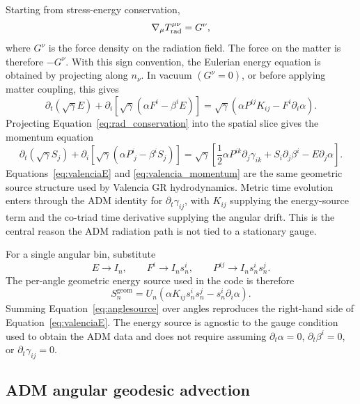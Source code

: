 \documentclass[11pt]{article}
\begin{document}
Starting from stress-energy conservation,
\begin{equation}
  \nabla_\mu T_{\rm rad}^{\mu\nu}=G^\nu ,
  \label{eq:rad_conservation}
\end{equation}
where \(G^\nu\) is the force density on the radiation field.  The force on the
matter is therefore \(-G^\nu\).  With this sign convention, the Eulerian energy
equation is obtained by projecting along \(n_\nu\).  In vacuum
\((G^\nu=0)\), or before applying matter coupling, this gives
\begin{equation}
  \partial_t(\sqrt{\gamma}E)
  +\partial_i\left[\sqrt{\gamma}(\alpha F^i-\beta^iE)\right]
  =
  \sqrt{\gamma}\left(\alpha P^{ij}K_{ij}
  -F^i\partial_i\alpha\right).
  \label{eq:valenciaE}
\end{equation}
Projecting Equation~\eqref{eq:rad_conservation} into the spatial slice gives
the momentum equation
\begin{equation}
  \partial_t(\sqrt{\gamma}S_j)
  +\partial_i\left[\sqrt{\gamma}(\alpha P^i_{\ j}-\beta^iS_j)\right]
  =
  \sqrt{\gamma}\left[
    \frac{1}{2}\alpha P^{ik}\partial_j\gamma_{ik}
    +S_i\partial_j\beta^i
    -E\partial_j\alpha\right].
  \label{eq:valencia_momentum}
\end{equation}
Equations~\eqref{eq:valenciaE} and \eqref{eq:valencia_momentum} are the same
geometric source structure used by Valencia GR hydrodynamics.  Metric time
evolution enters through the ADM identity for \(\partial_t\gamma_{ij}\), with
\(K_{ij}\) supplying the energy-source term and the co-triad time derivative
supplying the angular drift.  This is the central reason the ADM radiation path
is not tied to a stationary gauge.

For a single angular bin, substitute
\[
  E\rightarrow I_n,\qquad
  F^i\rightarrow I_ns^i_n,\qquad
  P^{ij}\rightarrow I_ns^i_ns^j_n .
\]
The per-angle geometric energy source used in the code is therefore
\begin{equation}
  S^{\mathrm{geom}}_n =
  U_n\left(\alpha K_{ij}s^i_ns^j_n
  -s^i_n\partial_i\alpha\right).
  \label{eq:anglesource}
\end{equation}
Summing Equation~\eqref{eq:anglesource} over angles reproduces the right-hand
side of Equation~\eqref{eq:valenciaE}.  The energy source is agnostic to the
gauge condition used to obtain the ADM data and does not require assuming
\(\partial_t \alpha=0\), \(\partial_t\beta^i=0\), or
\(\partial_t\gamma_{ij}=0\).

\subsection{ADM angular geodesic advection}
\end{document}
